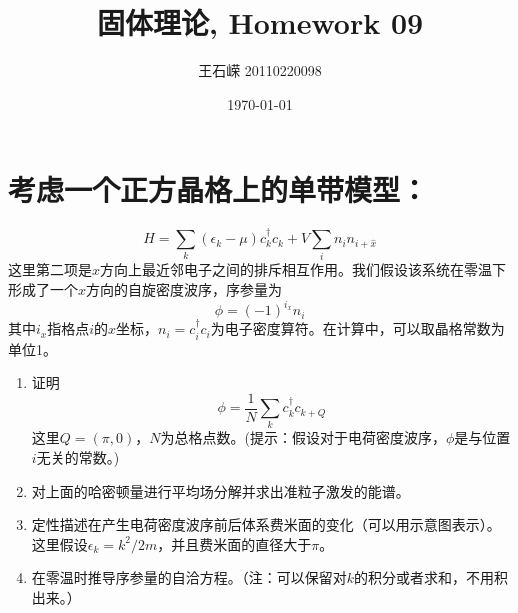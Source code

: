 \documentclass[a4paper]{article}
\title{固体理论, Homework 09}
\author{王石嵘 20110220098}
\date{\today} %
\numberwithin{equation}{section}
\begin{document}
\maketitle




\section{考虑一个正方晶格上的单带模型：}

\begin{equation}\label{key}
	H= \sum_k(\epsilon_k-\mu)c_k^\dagger c_k + V\sum_i n_i n_{i+\hat x}
\end{equation}
这里第二项是$ x $方向上最近邻电子之间的排斥相互作用。我们假设该系统在零温下形成了一个$ x $方向的自旋密度波序，序参量为
\begin{equation}\label{key}
	\phi = (-1)^{i_x}n_i
\end{equation}
其中$ i_x $指格点$ i $的$ x $坐标，$ n_i=c_i^\dagger c_i $为电子密度算符。在计算中，可以取晶格常数为单位1。

\begin{enumerate}
\item
证明
\begin{equation}\label{key}
	\phi = \frac1N \sum_k c_k^\dagger c_{k+Q}
\end{equation}
这里$ Q=(\pi,0) $，$ N $为总格点数。(提示：假设对于电荷密度波序，$ \phi $是与位置$ i $无关的常数。)
\item 对上面的哈密顿量进行平均场分解并求出准粒子激发的能谱。
\item 定性描述在产生电荷密度波序前后体系费米面的变化（可以用示意图表示）。
这里假设$ \epsilon_k=k^2/2m $，并且费米面的直径大于$ \pi $。
\item 在零温时推导序参量的自洽方程。（注：可以保留对$ k $的积分或者求和，不用积出来。）

\end{enumerate}
\end{document}
